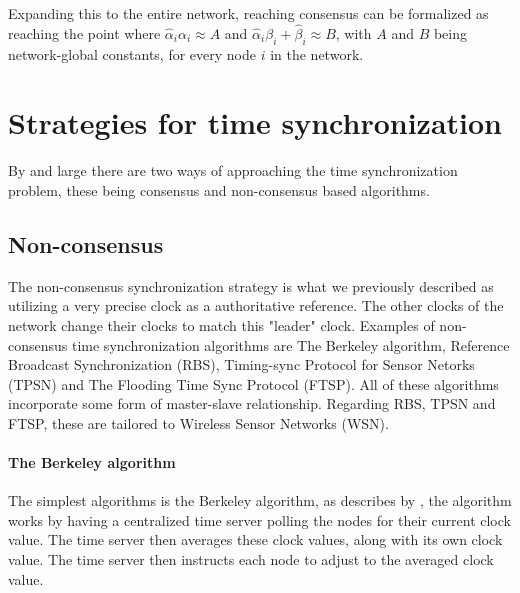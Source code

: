 \documentclass[a4paper,12pt]{article}
\begin{document}
Expanding this to the entire network, reaching consensus can be formalized as reaching the point where $\hat\alpha_i \alpha_i \approx A$ and $\hat\alpha_i \beta_i + \hat\beta_i \approx B$, with $A$ and $B$ being network-global constants, for every node $i$ in the network.


\section{Strategies for time synchronization}


By and large there are two ways of approaching the time synchronization problem, these being consensus and non-consensus based algorithms.

    \subsection{Non-consensus}
    The non-consensus synchronization strategy is what we previously described as utilizing a very precise clock as a authoritative reference. The other clocks of the network change their clocks to match this "leader" clock.
    Examples of non-consensus time synchronization algorithms are The Berkeley algorithm, Reference Broadcast Synchronization (RBS), Timing-sync Protocol for Sensor Netorks (TPSN) and The Flooding Time Sync Protocol (FTSP). All of these algorithms incorporate some form of master-slave relationship. Regarding RBS, TPSN and FTSP, these are tailored to Wireless Sensor Networks (WSN).
    
    \paragraph{The Berkeley algorithm} The simplest algorithms is the Berkeley algorithm, as describes by \citet{Gusella89}, the algorithm works by having a centralized time server polling the nodes for their current clock value. The time server then averages these clock values, along with its own clock value. The time server then instructs each node to adjust to the averaged clock value. 
\end{document}

